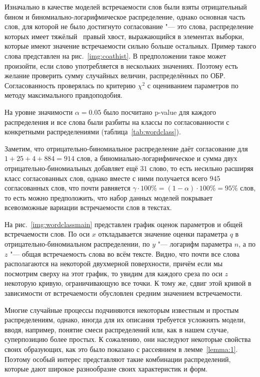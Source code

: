 \documentclass[12pt, specialist, subf, substylefile = spbu_report.rtx]{disser}
\begin{document}
	Изначально в качестве моделей встречаемости слов были взяты отрицательный бином и биномиально-логарифмическое распределение, однако основная часть слов, для которой не было достигнуто согласование "--- это слова, распределение которых имеет \glqq тяжёлый\grqq~ правый хвост, выражающийся в элементах выборки, которые имеют значение встречаемости сильно больше остальных. Пример такого слова представлен на рис.~\ref{img:coathist}. В предположении такое может произойти, если слово употребляется в нескольких значениях. Поэтому есть желание проверить сумму случайных величин, распределённых по ОБР. Согласованность проверялась по критерию $ \chi ^2 $ с оцениванием параметров по методу максимального правдоподобия.
	
	На уровне значимости $ \alpha = 0.05 $ было посчитано p-value для каждого распределения и все слова были разбиты на классы по согласованности с конкретными распределениями (таблица~\ref{tab:wordclass}).
	
	Заметим, что отрицательно-биномиальное распределение даёт согласование для $1 + 25 + 4 + 884 = 914$ слов, а биномиально-логарифмическое и сумма двух отрицательно-биномиальных добавляет ещё $31$ слово, то есть несильно расширяя класс согласованных слов, однако вместе с ними получается всего $945$ согласованных слов, что почти равняется $\gamma \cdot 100 \% = (1 - \alpha) \cdot 100 \% = 95 \%$ слов, то есть можно предположить, что набор данных моделей покрывает всевозможные вариации встречаемости слов в текстах.
	
	На рис.~\ref{img:wordclassmain} представлен график оценок параметров и общей встречаемости слов. По оси $x$ откладывается значение оценки параметра $q$ в отрицательно-биномиальном распределении, по $y$ "--- логарифм параметра $n$, а по $z$ "--- общая встречаемость слова во всём тексте. Видно, что почти все слова располагаются на некоторой двухмерной поверхности, причём если мы посмотрим сверху на этот график, то увидим для каждого среза по оси $z$ некоторую кривую, ограничивающую все точки. К тому же, сдвиг этой кривой в зависимости от встречаемости обусловлен средним значением встречаемости.
		
	\conclusion
	
	Многие случайные процессы подчиняются некоторым известным и простым распределениям, однако, иногда для их описания требуется усложнять модели, вводя, например, понятие смеси распределений или, как в нашем случае, суперпозицию более простых. К сожалению, они наследуют некоторые свойства своих образующих, как это было показано с рассеянием в лемме~\ref{lemma:1}. Поэтому особый интерес представляют такие комбинации распределений, которые дают широкое разнообразие своих характеристик и форм.
	
\end{document}
